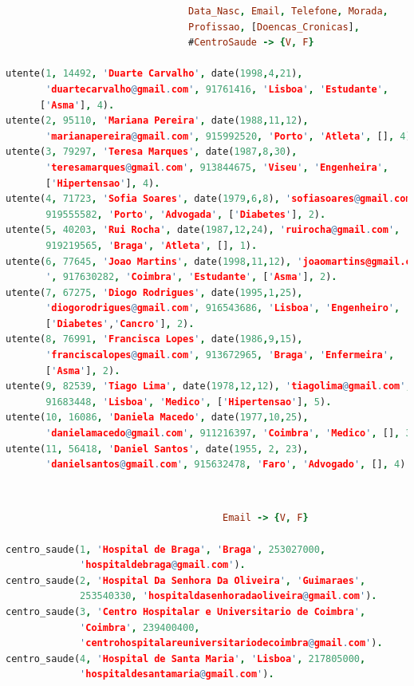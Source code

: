 \documentclass[a4paper, 11pt]{article}
\begin{document}
\begin{lstlisting}[language=Prolog, caption={Base de conhecimento de \texttt{utente}}]
% Extensao do predicado utente: #Idutente, No Seguranca_Social, Nome,
                                Data_Nasc, Email, Telefone, Morada,
                                Profissao, [Doencas_Cronicas],
                                #CentroSaude -> {V, F}

utente(1, 14492, 'Duarte Carvalho', date(1998,4,21),
       'duartecarvalho@gmail.com', 91761416, 'Lisboa', 'Estudante',
      ['Asma'], 4).
utente(2, 95110, 'Mariana Pereira', date(1988,11,12),
       'marianapereira@gmail.com', 915992520, 'Porto', 'Atleta', [], 4).      
utente(3, 79297, 'Teresa Marques', date(1987,8,30),
       'teresamarques@gmail.com', 913844675, 'Viseu', 'Engenheira',
       ['Hipertensao'], 4).      
utente(4, 71723, 'Sofia Soares', date(1979,6,8), 'sofiasoares@gmail.com',
       919555582, 'Porto', 'Advogada', ['Diabetes'], 2).      
utente(5, 40203, 'Rui Rocha', date(1987,12,24), 'ruirocha@gmail.com',
       919219565, 'Braga', 'Atleta', [], 1).      
utente(6, 77645, 'Joao Martins', date(1998,11,12), 'joaomartins@gmail.com
       ', 917630282, 'Coimbra', 'Estudante', ['Asma'], 2).      
utente(7, 67275, 'Diogo Rodrigues', date(1995,1,25),
       'diogorodrigues@gmail.com', 916543686, 'Lisboa', 'Engenheiro',
       ['Diabetes','Cancro'], 2).      
utente(8, 76991, 'Francisca Lopes', date(1986,9,15),
       'franciscalopes@gmail.com', 913672965, 'Braga', 'Enfermeira',
       ['Asma'], 2).
utente(9, 82539, 'Tiago Lima', date(1978,12,12), 'tiagolima@gmail.com',
       91683448, 'Lisboa', 'Medico', ['Hipertensao'], 5).      
utente(10, 16086, 'Daniela Macedo', date(1977,10,25),
       'danielamacedo@gmail.com', 911216397, 'Coimbra', 'Medico', [], 3).
utente(11, 56418, 'Daniel Santos', date(1955, 2, 23),
       'danielsantos@gmail.com', 915632478, 'Faro', 'Advogado', [], 4).
\end{lstlisting}

\

\begin{lstlisting}[language=Prolog, caption={Base de conhecimento de \texttt{centro\_saude}}]
% Extensao do predicado centro_saude: #Idcentro, Nome, Morada, Telefone,
                                      Email -> {V, F}
                                      
centro_saude(1, 'Hospital de Braga', 'Braga', 253027000,
             'hospitaldebraga@gmail.com').
centro_saude(2, 'Hospital Da Senhora Da Oliveira', 'Guimaraes',
             253540330, 'hospitaldasenhoradaoliveira@gmail.com').
centro_saude(3, 'Centro Hospitalar e Universitario de Coimbra',
             'Coimbra', 239400400,
             'centrohospitalareuniversitariodecoimbra@gmail.com').
centro_saude(4, 'Hospital de Santa Maria', 'Lisboa', 217805000,
             'hospitaldesantamaria@gmail.com').
\end{lstlisting}
\end{document}
